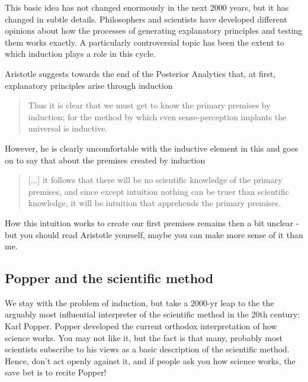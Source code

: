 \documentclass{tufte-book}
\begin{document}
This basic idea has not changed enormously in the next 2000 years, but it has changed in subtle details. Philosophers and scientists have developed different opinions about how the processes of generating explanatory principles and testing them works exactly. A particularly controversial topic has been the extent to which induction plays a role in this cycle. 

Aristotle suggests towards the end of the Posterior Analytics that, at first, explanatory principles arise through induction

\begin{quote}
    Thus it is clear that we must get to know the primary premises by induction; for the method by which even sense-perception implants the universal is inductive. 
\end{quote}

However, he is clearly uncomfortable with the inductive element in this and goes on to say that about the premises created by induction

\begin{quote}
[...] it follows that there will be no scientific knowledge of the primary premises, and since except intuition nothing can be truer than scientific knowledge, it will be intuition that apprehends the primary premises. 
\end{quote}

How this intuition works to create our first premises remains then a bit unclear - but you should read Aristotle yourself, maybe you can make more sense of it than me. 

\subsection{Popper and the scientific method}

We stay with the problem of induction, but take a 2000-yr leap to the the arguably most influential interpreter of the scientific method in the 20th century: Karl Popper. Popper developed the current orthodox interpretation of how science works. You may not like it, but the fact is that many, probably most scientists subscribe to his views as a basic description of the scientific method. Hence, don't act openly against it, and if people ask you how science works, the save bet is to recite Popper! 
\end{document}
